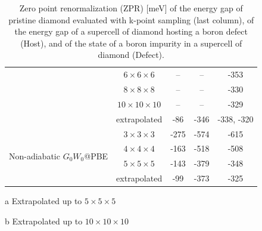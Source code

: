 \documentclass[journal=jctcce,manuscript=article]{achemso}
\begin{document}
\begin{table}[]
\begin{threeparttable}
\begin{tabular}{ccccc}
    & $6\times 6\times 6$ & --                  & -- & -353 \\
    & $8\times 8\times 8$ & --                  & -- & -330 \\
    & $10\times 10\times 10$ & --               & -- & -329 \\
    & extrapolated & -86\tnote{a} & -346\tnote{a} & -338\tnote{a}, -320\tnote{b} \\
    \hline
    \multirow{4}{*}{Non-adiabatic $G_0W_0$@PBE}& $3\times 3\times 3$ &	-275 & -574                             &  -615 \\
    & $4\times 4\times 4$  &	-163 & -518                           &  -508 \\
    & $5\times 5\times 5$  & -143 & -379                            &  -348 \\
    & extrapolated & -99\tnote{a} & -373\tnote{a} & -325\tnote{a} \\
    \hline\hline
    \end{tabular}
    \begin{tablenotes}
    \item[a] Extrapolated up to $5\times 5\times 5$
    \item[b] Extrapolated up to $10\times 10\times 10$
    \end{tablenotes}
    \end{threeparttable}
    \caption{Zero point renormalization (ZPR) [meV] of the energy gap of pristine diamond evaluated with k-point sampling (last column), of the energy gap of a supercell of diamond hosting a boron defect (Host), and of the state of a boron impurity in a supercell of diamond (Defect).}
    \label{tab:boron_defect_zpr}
\end{table}
\end{document}
